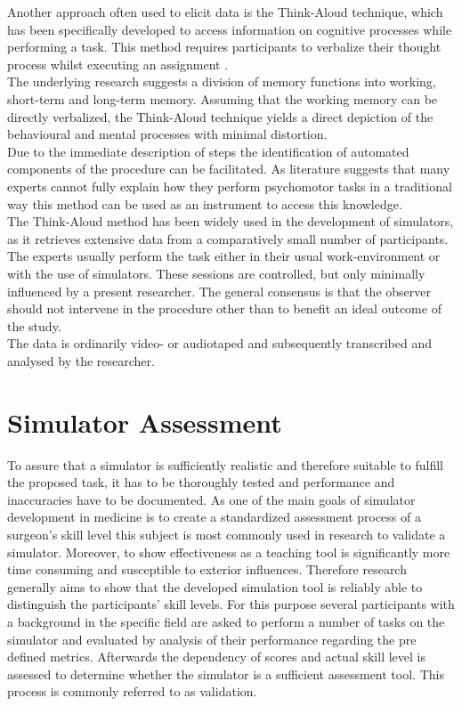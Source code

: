 Another approach often used to elicit data is the Think-Aloud technique, which has been specifically developed to access information on cognitive processes while performing a task. This method requires participants to verbalize their thought process whilst executing an assignment \parencite{jaspers_comparison_2009}. \\
The underlying research suggests a division of memory functions into working, short-term and long-term memory. Assuming that the working memory can be directly verbalized, the Think-Aloud technique yields a direct depiction of the behavioural and mental processes with minimal distortion\parencite{jaspers_comparison_2009}\parencite{lundgren-laine_think-aloud_2010}. \\
Due to the immediate description of steps the identification of automated components of the procedure can be facilitated. As literature suggests that many experts cannot fully explain how they perform psychomotor tasks in a traditional way this method can be used as an instrument to access this knowledge\parencite{low-beer_hidden_2011}.\\
The Think-Aloud method has been widely used in the development of simulators, as it retrieves extensive data from a comparatively small number of participants. The experts usually perform the task either in their usual work-environment or with the use of simulators. These sessions are controlled, but only minimally influenced by a present researcher. The general consensus is that the observer should not intervene in the procedure other than to benefit an ideal outcome of the study\parencite{lundgren-laine_think-aloud_2010}. \\
The data is ordinarily video- or audiotaped and subsequently transcribed and analysed by the researcher.  

\section{Simulator Assessment}

To assure that a simulator is sufficiently realistic and therefore suitable to fulfill the proposed task, it has to be thoroughly tested and performance and inaccuracies have to be documented. 
As one of the main goals of simulator development in medicine is to create a standardized assessment process of a surgeon’s skill level this subject is most commonly used in research to validate a simulator. Moreover, to show effectiveness as a teaching tool is significantly more time consuming and susceptible to exterior influences. 
Therefore research generally aims to show that the developed simulation tool is reliably able to distinguish the participants’ skill levels. For this purpose several participants with a background in the specific field are asked to perform a number of tasks on the simulator and evaluated by analysis of their performance regarding the pre defined metrics. Afterwards the dependency of scores and actual skill level is assessed to determine whether the simulator is a sufficient assessment tool. This process is commonly referred to as validation. 

